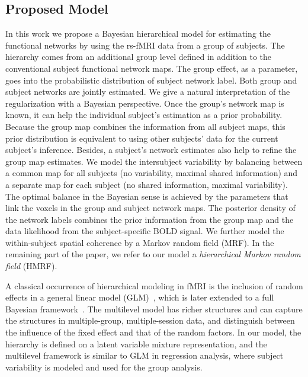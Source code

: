 \documentclass[review,authoryear]{elsarticle}
\begin{document}
\subsection{Proposed Model}
In this work we propose a Bayesian hierarchical model for estimating the
functional networks by using the rs-fMRI data from a group of subjects. The
hierarchy comes from an additional group level defined in addition to the
conventional subject functional network maps. The group effect, as a parameter,
goes into the probabilistic distribution of subject network label. Both group
and subject networks are jointly estimated. We give a natural interpretation of
the regularization with a Bayesian perspective. Once the group's network map is
known, it can help the individual subject's estimation as a prior probability.
Because the group map combines the information from all subject maps, this prior
distribution is equivalent to using other subjects' data for the current
subject's inference.  Besides, a subject's network estimates also help to refine
the group map estimates. We model the intersubject variability by balancing
between a common map for all subjects (no variability, maximal shared
information) and a separate map for each subject (no shared information, maximal
variability). The optimal balance in the Bayesian sense is achieved by the
parameters that link the voxels in the group and subject network maps.  The
posterior density of the network labels combines the prior information from the
group map and the data likelihood from the subject-specific BOLD signal. We
further model the within-subject spatial coherence by a Markov random field
(MRF). In the remaining part of the paper, we refer to our model a
\emph{hierarchical Markov random field} (HMRF).

A classical occurrence of hierarchical modeling in fMRI is the inclusion of
random effects in a general linear model (GLM)~\citep{beckmann2003general},
which is later extended to a full Bayesian
framework~\citep{woolrich2004multilevel}. The multilevel model has richer
structures and can capture the structures in multiple-group, multiple-session
data, and distinguish between the influence of the fixed effect and that of the
random factors. In our model, the hierarchy is defined on a latent variable
mixture representation, and the multilevel framework is similar to GLM in
regression analysis, where subject variability is modeled and used for the group
analysis.
\end{document}
